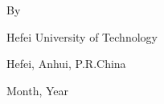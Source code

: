 \begin{titlepage}
\centering
{
\parskip=0pt \linespread{1.25}
\vspace{4.7cm}

\Large \bfseries{\titleEn} \vspace{1.8cm}}

{\sanhao By

\studentNameEn
\vfill
Hefei University of Technology

Hefei, Anhui, P.R.China

\finishedMonth\enspace Month, \finishedYear\enspace Year
\vspace{3cm}
}

\end{titlepage}
